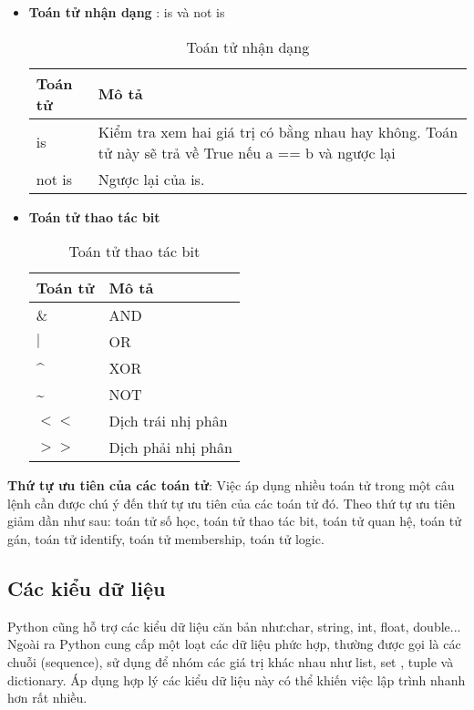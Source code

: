 \documentclass[../main-report.tex]{subfiles}
\begin{document}
\begin{itemize}
\item \textbf{Toán tử nhận dạng} : is và not is
\begin{table}[ht!]
\centering
\begin{tabular}{|>{\centering\arraybackslash}p{2cm}|>{\centering\arraybackslash}p{6cm}|}
\hline
\textbf{Toán tử} & \textbf{Mô tả}             \\ \hline
is             & Kiểm tra xem hai giá trị có bằng nhau hay không. Toán tử này sẽ trả về True nếu a == b và ngược lại                 \\ \hline
not is            & Ngược lại của is.          \\ \hline
\end{tabular}
\caption{Toán tử nhận dạng}
\label{tab:toán tử nhận dạng}
\end{table}

\item \textbf{Toán tử thao tác bit}
\begin{table}[ht!]
\centering
\begin{tabular}{|>{\centering\arraybackslash}p{2cm}|>{\centering\arraybackslash}p{5cm}|}
\hline
\textbf{Toán tử} & \textbf{Mô tả}        \\ \hline
$\&$             & AND                  \\ \hline
$|$             & OR                      \\ \hline
\textasciicircum          & XOR                    \\ \hline
\textasciitilde             & NOT                    \\ \hline
$<<$              & Dịch trái nhị phân   \\ \hline
$>>$             & Dịch phải nhị phân       \\ \hline
\end{tabular}
\caption{Toán tử thao tác bit}
\label{tab:Toán tử thao tác bit}
\end{table}
\end{itemize} 

\textbf{Thứ tự ưu tiên của các toán tử}: Việc áp dụng nhiều toán tử trong một câu lệnh cần được chú ý đến thứ tự ưu tiên
của các toán tử đó. Theo thứ tự ưu tiên giảm dần như sau: toán tử số học, toán tử
thao tác bit, toán tử quan hệ, toán tử gán, toán tử identify, toán tử membership,
toán tử logic.

\subsection{Các kiểu dữ liệu}
Python cũng hỗ trợ các kiểu dữ liệu căn bản như:char, string, int, float, double... Ngoài ra Python cung cấp
một loạt các dữ liệu phức hợp, thường được gọi là các chuỗi (sequence), sử dụng để nhóm các
giá trị khác nhau như list, set , tuple và dictionary. Áp dụng hợp lý các kiểu dữ liệu này có thể
khiến việc lập trình nhanh hơn rất nhiều.
\end{document}
